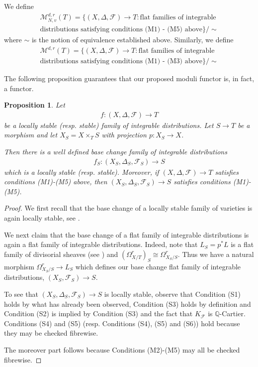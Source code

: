\documentclass[12pt, a4paper]{amsart}
\newcounter{Theorem}
\newtheorem{proposition}[theorem]{Proposition}
\theoremstyle{definition}
\theoremstyle{named}
\begin{document}
We define
\begin{align*}
\mathcal M^{d, r}_{N, v}(T) = \{(X, \Delta, \mathcal F) \to T: 
\text{flat families of integrable } \\
\text{distributions satisfying conditions 
(M1) - (M5) above}\}/\sim
\end{align*}
where $\sim$ is the notion of equivalence established above.
Similarly, we define 
\begin{align*}
\mathcal M^{d, r}(T) = \{(X, \Delta, \mathcal F) \to T: 
\text{flat families of integrable } \\
\text{distributions satisfying conditions 
(M1) - (M3) above}\}/\sim
\end{align*}

The following proposition guarantees that our proposed moduli functor is, in fact, a functor.

\begin{proposition}
\label{prop_base_change}
Let \begin{align*}f\colon (X, \Delta, \mathcal F) \rightarrow T\end{align*}
be a locally stable (resp. stable) family of integrable distributions.  Let $S \rightarrow T$ be a morphism and let $X_S = X \times_TS$ with projection $p\colon X_S \to X$.

Then there is a well defined base change family of integrable distributions
\begin{align*}f_S\colon (X_S, \Delta_S, \mathcal F_S) \rightarrow S\end{align*}
which is a locally stable (resp. stable).
Moreover, if $(X, \Delta, \mathcal F) \to T$ satisfies conditions (M1)-(M5) above, 
then $(X_S, \Delta_S, \mathcal F_S) \to S$ satisfies conditions (M1)-(M5).
\end{proposition}
\begin{proof}
We first recall that the base change of a locally stable family of varieties is again locally stable, see \cite[Theorem 3.2]{modbook}.  

We next claim that 
 the base change of a flat family of integrable distributions is again a
flat family of integrable distributions.
Indeed, note that $L_S = p^*L$ is a flat family of divisorial sheaves
(see \cite[Definition 3.25]{modbook})
and $(\Omega^r_{X/T})_S \cong 
\Omega^r_{X_S/S}$.
Thus we have a natural morphism $\Omega^r_{X_S/S} \rightarrow L_S$
which defines our base change flat family of integrable distributions, 
$(X_S, \mathcal F_S) \rightarrow S$.

To see that $(X_S, \Delta_S, \mathcal F_S) \to S$ is locally stable, observe that 
Condition (S1) holds by what has already been observed, Condition (S3) holds by definition and Condition (S2) is implied by Condition (S3) and the fact that $K_{\mathcal F}$ is $\mathbb Q$-Cartier.  Conditions (S4) and (S5) (resp. Conditions (S4), (S5) and (S6)) hold because they may be checked fibrewise.


The moreover part follows because Conditions (M2)-(M5) may all be checked fibrewise.
\end{proof}  
\end{document}
